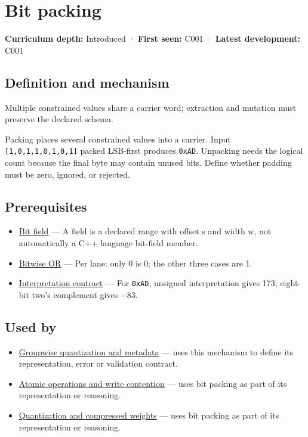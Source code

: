 \hypertarget{appendix-1f9963e1a5d1}{}\label{referencestart:appendix-1f9963e1a5d1}
\section{Bit packing}\label{appendix-1f9963e1a5d1-bit-packing}

\textbf{Curriculum depth:} Introduced · \textbf{First seen:} C001 · \textbf{Latest development:} C001

\subsection{Definition and mechanism}\label{appendix-1f9963e1a5d1-definition-and-mechanism}

Multiple constrained values share a carrier word; extraction and mutation must preserve the declared schema.

Packing places several constrained values into a carrier. Input \texttt{{[}1,0,1,1,0,1,0,1{]}} packed LSB-first produces \texttt{0xAD}. Unpacking needs the logical count because the final byte may contain unused bits. Define whether padding must be zero, ignored, or rejected.

\subsection{Prerequisites}\label{appendix-1f9963e1a5d1-prerequisites}

\begin{itemize}
\tightlist
\item
  \hyperref[appendix-ac697f5c66e8]{Bit field} --- A field is a declared range with offset s and width w, not automatically a C++ language bit-field member.
\item
  \hyperref[appendix-a427ce8ce8a6]{Bitwise OR} --- Per lane: only 0 is 0; the other three cases are 1.
\item
  \hyperref[appendix-f414bd4ed05c]{Interpretation contract} --- For \texttt{0xAD}, unsigned interpretation gives 173; eight-bit two's complement gives −83.
\end{itemize}

\subsection{Used by}\label{appendix-1f9963e1a5d1-used-by}

\begin{itemize}
\item
  \hyperref[appendix-638204c40e8b]{Groupwise quantization and metadata} --- uses this mechanism to define its representation, error or validation contract.
\item
  \hyperref[appendix-e12d1b03fefb]{Atomic operations and write contention} --- uses bit packing as part of its representation or reasoning.
\item
  \hyperref[appendix-fdc7879e8bf2]{Quantization and compressed weights} --- uses bit packing as part of its representation or reasoning.
\end{itemize}

